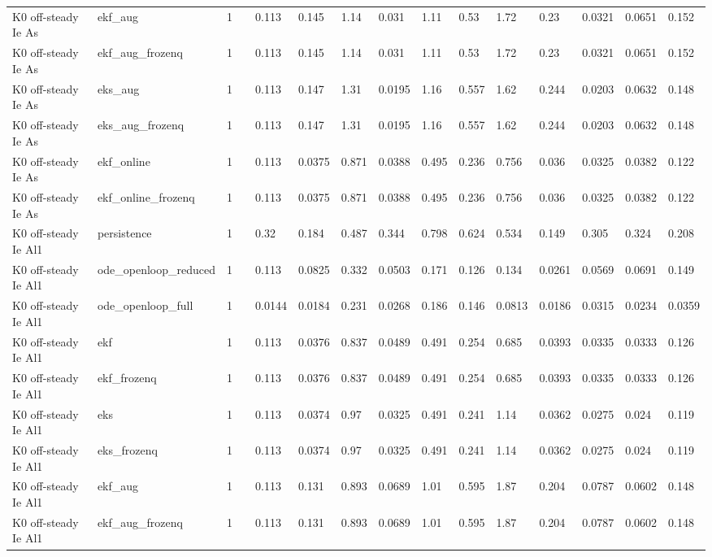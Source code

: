 \begin{table}[t]
\begin{tabular}{lllllllllllllll}
K0 off-steady Ie As & ekf\_aug & 1 &  & 0.113 & 0.145 & 1.14 & 0.031 & 1.11 & 0.53 & 1.72 & 0.23 & 0.0321 & 0.0651 & 0.152 \\
K0 off-steady Ie As & ekf\_aug\_frozenq & 1 &  & 0.113 & 0.145 & 1.14 & 0.031 & 1.11 & 0.53 & 1.72 & 0.23 & 0.0321 & 0.0651 & 0.152 \\
K0 off-steady Ie As & eks\_aug & 1 &  & 0.113 & 0.147 & 1.31 & 0.0195 & 1.16 & 0.557 & 1.62 & 0.244 & 0.0203 & 0.0632 & 0.148 \\
K0 off-steady Ie As & eks\_aug\_frozenq & 1 &  & 0.113 & 0.147 & 1.31 & 0.0195 & 1.16 & 0.557 & 1.62 & 0.244 & 0.0203 & 0.0632 & 0.148 \\
K0 off-steady Ie As & ekf\_online & 1 &  & 0.113 & 0.0375 & 0.871 & 0.0388 & 0.495 & 0.236 & 0.756 & 0.036 & 0.0325 & 0.0382 & 0.122 \\
K0 off-steady Ie As & ekf\_online\_frozenq & 1 &  & 0.113 & 0.0375 & 0.871 & 0.0388 & 0.495 & 0.236 & 0.756 & 0.036 & 0.0325 & 0.0382 & 0.122 \\
K0 off-steady Ie Al1 & persistence & 1 &  & 0.32 & 0.184 & 0.487 & 0.344 & 0.798 & 0.624 & 0.534 & 0.149 & 0.305 & 0.324 & 0.208 \\
K0 off-steady Ie Al1 & ode\_openloop\_reduced & 1 &  & 0.113 & 0.0825 & 0.332 & 0.0503 & 0.171 & 0.126 & 0.134 & 0.0261 & 0.0569 & 0.0691 & 0.149 \\
K0 off-steady Ie Al1 & ode\_openloop\_full & 1 &  & 0.0144 & 0.0184 & 0.231 & 0.0268 & 0.186 & 0.146 & 0.0813 & 0.0186 & 0.0315 & 0.0234 & 0.0359 \\
K0 off-steady Ie Al1 & ekf & 1 &  & 0.113 & 0.0376 & 0.837 & 0.0489 & 0.491 & 0.254 & 0.685 & 0.0393 & 0.0335 & 0.0333 & 0.126 \\
K0 off-steady Ie Al1 & ekf\_frozenq & 1 &  & 0.113 & 0.0376 & 0.837 & 0.0489 & 0.491 & 0.254 & 0.685 & 0.0393 & 0.0335 & 0.0333 & 0.126 \\
K0 off-steady Ie Al1 & eks & 1 &  & 0.113 & 0.0374 & 0.97 & 0.0325 & 0.491 & 0.241 & 1.14 & 0.0362 & 0.0275 & 0.024 & 0.119 \\
K0 off-steady Ie Al1 & eks\_frozenq & 1 &  & 0.113 & 0.0374 & 0.97 & 0.0325 & 0.491 & 0.241 & 1.14 & 0.0362 & 0.0275 & 0.024 & 0.119 \\
K0 off-steady Ie Al1 & ekf\_aug & 1 &  & 0.113 & 0.131 & 0.893 & 0.0689 & 1.01 & 0.595 & 1.87 & 0.204 & 0.0787 & 0.0602 & 0.148 \\
K0 off-steady Ie Al1 & ekf\_aug\_frozenq & 1 &  & 0.113 & 0.131 & 0.893 & 0.0689 & 1.01 & 0.595 & 1.87 & 0.204 & 0.0787 & 0.0602 & 0.148 \\

\end{tabular}
\end{table}
